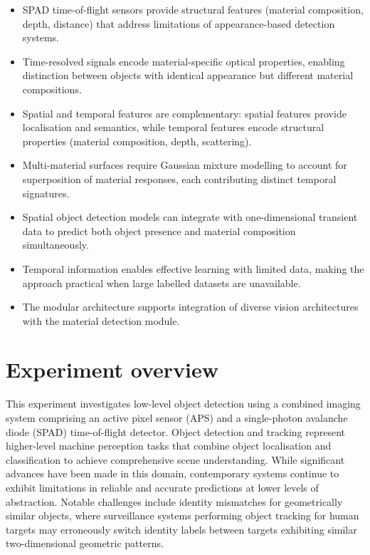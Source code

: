 \documentclass[12pt,a4paper,oneside]{report}
\let\oldsection\section
\renewcommand{\section}{\clearpage\oldsection}
\begin{document}
\begin{itemize}
    \item SPAD time-of-flight sensors provide structural features (material composition, depth, distance) that address limitations of appearance-based detection systems.
    
    \item Time-resolved signals encode material-specific optical properties, enabling distinction between objects with identical appearance but different material compositions.
    
    \item Spatial and temporal features are complementary: spatial features provide localisation and semantics, while temporal features encode structural properties (material composition, depth, scattering).
    
    \item Multi-material surfaces require Gaussian mixture modelling to account for superposition of material responses, each contributing distinct temporal signatures.
    
    \item Spatial object detection models can integrate with one-dimensional transient data to predict both object presence and material composition simultaneously.
    
    \item Temporal information enables effective learning with limited data, making the approach practical when large labelled datasets are unavailable.
    
    \item The modular architecture supports integration of diverse vision architectures with the material detection module.
\end{itemize}

\newpage
\section{Experiment overview}
\label{sec:experiment_overview}

This experiment investigates low-level object detection using a combined imaging system comprising an active pixel sensor (APS) and a single-photon avalanche diode (SPAD) time-of-flight detector. Object detection and tracking represent higher-level machine perception tasks that combine object localisation and classification to achieve comprehensive scene understanding. While significant advances have been made in this domain, contemporary systems continue to exhibit limitations in reliable and accurate predictions at lower levels of abstraction. Notable challenges include identity mismatches for geometrically similar objects, where surveillance systems performing object tracking for human targets may erroneously switch identity labels between targets exhibiting similar two-dimensional geometric patterns.
\end{document}
